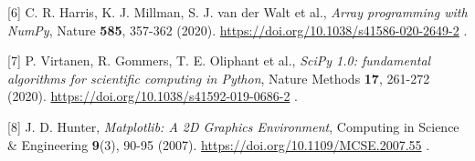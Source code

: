{[}6{]} C. R. Harris, K. J. Millman, S. J. van der Walt et al.,
\emph{Array programming with NumPy}, Nature \textbf{585}, 357-362
(2020). \url{https://doi.org/10.1038/s41586-020-2649-2} .

{[}7{]} P. Virtanen, R. Gommers, T. E. Oliphant et al., \emph{SciPy 1.0:
fundamental algorithms for scientific computing in Python}, Nature
Methods \textbf{17}, 261-272 (2020).
\url{https://doi.org/10.1038/s41592-019-0686-2} .

{[}8{]} J. D. Hunter, \emph{Matplotlib: A 2D Graphics Environment},
Computing in Science \& Engineering \textbf{9}(3), 90-95 (2007).
\url{https://doi.org/10.1109/MCSE.2007.55} .

\endgroup
